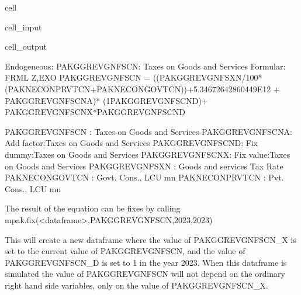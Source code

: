 \documentclass[letterpaper,10pt,english]{jupyterBook}
\begin{document}
\begin{sphinxuseclass}{cell}\begin{sphinxVerbatimInput}

\begin{sphinxuseclass}{cell_input}
\begin{sphinxVerbatim}[commandchars=\\\{\}]
\end{sphinxVerbatim}

\end{sphinxuseclass}\end{sphinxVerbatimInput}
\begin{sphinxVerbatimOutput}

\begin{sphinxuseclass}{cell_output}
\begin{sphinxVerbatim}[commandchars=\\\{\}]
Endogeneous: PAKGGREVGNFSCN: Taxes on Goods and Services
Formular: FRML \PYGZlt{}Z,EXO\PYGZgt{} PAKGGREVGNFSCN = ((PAKGGREVGNFSXN/100*(PAKNECONPRVTCN+PAKNECONGOVTCN))+5.34672642860449E\PYGZhy{}12 + PAKGGREVGNFSCN\PYGZus{}A)* (1\PYGZhy{}PAKGGREVGNFSCN\PYGZus{}D)+ PAKGGREVGNFSCN\PYGZus{}X*PAKGGREVGNFSCN\PYGZus{}D  \PYGZdl{}

PAKGGREVGNFSCN  : Taxes on Goods and Services
PAKGGREVGNFSCN\PYGZus{}A: Add factor:Taxes on Goods and Services
PAKGGREVGNFSCN\PYGZus{}D: Fix dummy:Taxes on Goods and Services
PAKGGREVGNFSCN\PYGZus{}X: Fix value:Taxes on Goods and Services
PAKGGREVGNFSXN  : Goods and services Tax Rate
PAKNECONGOVTCN  : Govt. Cons., LCU mn
PAKNECONPRVTCN  : Pvt. Cons., LCU mn
\end{sphinxVerbatim}

\end{sphinxuseclass}\end{sphinxVerbatimOutput}

\end{sphinxuseclass}
\sphinxAtStartPar
The result of the equation can be fixes by calling mpak.fix(<dataframe>,PAKGGREVGNFSCN,2023,2023)

\sphinxAtStartPar
This will create a new dataframe where the value of PAKGGREVGNFSCN\_X is set to the current value of PAKGGREVGNFSCN, and the value of PAKGGREVGNFSCN\_D is set to 1 in the year 2023.
When this dataframe is simulated the value of PAKGGREVGNFSCN will not depend on the ordinary right hand side variables, only on the value of PAKGGREVGNFSCN\_X.
\end{document}
